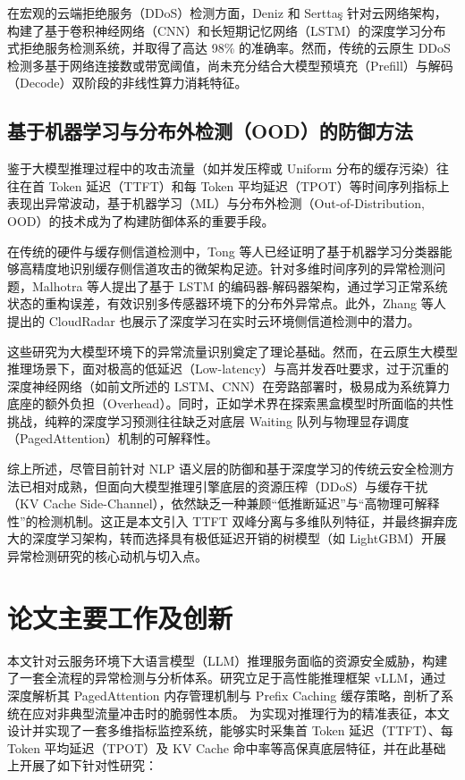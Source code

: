 \documentclass[master, vlined]{DissertUESTC}
\begin{document}
	在宏观的云端拒绝服务（DDoS）检测方面，Deniz 和 Serttaş 针对云网络架构，构建了基于卷积神经网络（CNN）和长短期记忆网络（LSTM）的深度学习分布式拒绝服务检测系统，并取得了高达 98\% 的准确率\cite{基于深度学习的云网络中分布式拒绝服务检测系统}。然而，传统的云原生 DDoS 检测多基于网络连接数或带宽阈值，尚未充分结合大模型预填充（Prefill）与解码（Decode）双阶段的非线性算力消耗特征。

	\subsection{基于机器学习与分布外检测（OOD）的防御方法}
	鉴于大模型推理过程中的攻击流量（如并发压榨或 Uniform 分布的缓存污染）往往在首 Token 延迟（TTFT）和每 Token 平均延迟（TPOT）等时间序列指标上表现出异常波动，基于机器学习（ML）与分布外检测（Out-of-Distribution, OOD）的技术成为了构建防御体系的重要手段。 

	在传统的硬件与缓存侧信道检测中，Tong 等人已经证明了基于机器学习分类器能够高精度地识别缓存侧信道攻击的微架构足迹\cite{基于机器学习的缓存侧信道攻击检测}。针对多维时间序列的异常检测问题，Malhotra 等人提出了基于 LSTM 的编码器-解码器架构，通过学习正常系统状态的重构误差，有效识别多传感器环境下的分布外异常点\cite{基于LSTM的编码器-解码器用于多传感器异常检测}。此外，Zhang 等人提出的 CloudRadar 也展示了深度学习在实时云环境侧信道检测中的潜力\cite{云网络中基于深度学习的分布式拒绝服务检测系统}。
	
	这些研究为大模型环境下的异常流量识别奠定了理论基础。然而，在云原生大模型推理场景下，面对极高的低延迟（Low-latency）与高并发吞吐要求，过于沉重的深度神经网络（如前文所述的 LSTM、CNN）在旁路部署时，极易成为系统算力底座的额外负担（Overhead）。同时，正如学术界在探索黑盒模型时所面临的共性挑战，纯粹的深度学习预测往往缺乏对底层 Waiting 队列与物理显存调度（PagedAttention）机制的可解释性。

	综上所述，尽管目前针对 NLP 语义层的防御和基于深度学习的传统云安全检测方法已相对成熟，但面向大模型推理引擎底层的资源压榨（DDoS）与缓存干扰（KV Cache Side-Channel），依然缺乏一种兼顾“低推断延迟”与“高物理可解释性”的检测机制。这正是本文引入 TTFT 双峰分离与多维队列特征，并最终摒弃庞大的深度学习架构，转而选择具有极低延迟开销的树模型（如 LightGBM）开展异常检测研究的核心动机与切入点。


	\section{论文主要工作及创新}

	本文针对云服务环境下大语言模型（LLM）推理服务面临的资源安全威胁，构建了一套全流程的异常检测与分析体系。研究立足于高性能推理框架 vLLM，通过深度解析其 PagedAttention 内存管理机制与 Prefix Caching 缓存策略，剖析了系统在应对非典型流量冲击时的脆弱性本质。
	为实现对推理行为的精准表征，本文设计并实现了一套多维指标监控系统，能够实时采集首 Token 延迟（TTFT）、每 Token 平均延迟（TPOT）及 KV Cache 命中率等高保真底层特征，并在此基础上开展了如下针对性研究：
\end{document}
